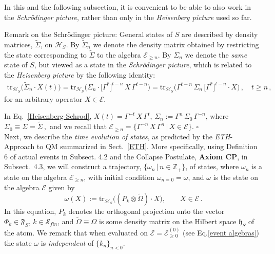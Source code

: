 \documentclass[12pt]{article}
\begin{document}
In this and the following subsection, it is convenient to be able to also work in the \textit{Schr\"odinger picture}, rather than
only in the \textit{Heisenberg picture} used so far.

{Remark on the Schr\"odinger picture}: General states of $S$ are described by density matrices,
$\widetilde{\Sigma}$, on $\mathcal{H}_S$. By
$\widetilde{\Sigma}_{n}$ we denote the density matrix obtained by restricting the state corresponding to $\widetilde{\Sigma}$ to the algebra $\mathcal{E}_{\geq n}$. By
$\Sigma_{n}$ we denote the \textit{same} state of $S$, but viewed as a state in the \textit{Schr\"odinger picture}, which is related to the \textit{Heisenberg  picture} by the following identity:
\begin{align}\label{Heisenberg-Schrod}
\text{tr}_{\mathcal{H}_S}\big(\widetilde{\Sigma}_{n}\cdot X(t)\big) = \text{tr}_{\mathcal{H}_S} \big(\Sigma_{n}\cdot
\big[\Gamma^{*}\big]^{t-n} \,X\, \Gamma^{t-n}\big) = \text{tr}_{\mathcal{H}_S} \big(\Gamma^{t-n}\,\Sigma_{n} \,
\big[\Gamma^{*}\big]^{t-n}\cdot X\big)\,, \quad t\geq n\,,
\end{align}
for an arbitrary operator $X \in \mathcal{E}$.

In Eq.~\eqref{Heisenberg-Schrod},  $X(t)= \Gamma^{-t} \,X\, \Gamma^{t}$,
$\Sigma_n := \Gamma^{n}\, \Sigma_{0}\, \Gamma^{-n}$, where $\Sigma_{0}\equiv \Sigma = \widetilde{\Sigma}\,,$  and
we recall that $\mathcal{E}_{\geq n}=\big\{\Gamma^{-n}\,X\,\Gamma^{n}\,\big|\, X\in \mathcal{E}\big\}$. \hspace{10cm}
$\square$\\

Next, we describe the \textit{time evolution of states}, as predicted by the \textit{ETH}-Approach to QM summarized
in Sect.~\ref{ETH}. More specifically, using Definition 6 of actual events in Subsect. 4.2 and the Collapse Postulate, {\bf{Axiom CP}}, in Subsect.~4.3, we will construct a trajectory, $\big\{\omega_n\, \big| \, n\in \mathbb{Z}_{+}\big\}$,
of states, where $\omega_n$ is a state on the algebra $\mathcal{E}_{\geq n}$, with initial condition
$\omega_{n=0}=\omega$, and $\omega$ is the state on the algebra $\mathcal{E}$ given by
\begin{equation}\label{initial cond}
\omega(X):= \text{tr}_{\mathcal{H}_S}\big((P_{{k}} \otimes \widetilde{\Omega})\cdot X\big), \qquad X\in \mathcal{E}\,.
\end{equation}
In this equation, $P_{{k}}$ denotes the orthogonal projection onto the vector
$\Phi_{{k}} \in \mathfrak{F}_S,\,  {k}\in \mathcal{S}_{fin}$, and $\widetilde{\Omega}\equiv \Omega$
is some density matrix on the Hilbert space $\mathfrak{h}_S$ of the atom.
We remark that when evaluated on $\mathcal{E}= \mathcal{E}_{\geq 0}^{(0)}$ (see Eq.\eqref{event algebras}) the state $\omega$
is \textit{independent} of $\{k_n\}_{n<0}$.
\end{document}
